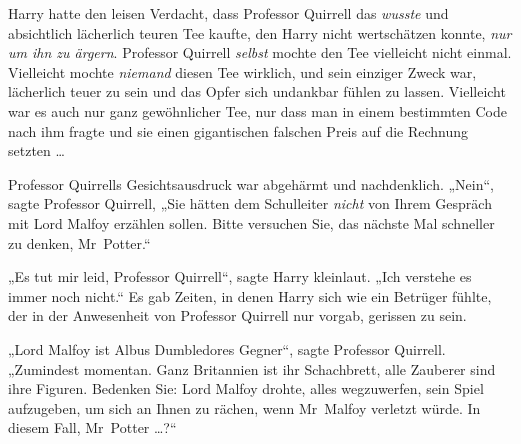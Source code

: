 Harry hatte den leisen Verdacht, dass Professor Quirrell das \emph{wusste} und absichtlich lächerlich teuren Tee kaufte, den Harry nicht wertschätzen konnte, \emph{nur um ihn zu ärgern}. Professor Quirrell \emph{selbst} mochte den Tee vielleicht nicht einmal. Vielleicht mochte \emph{niemand} diesen Tee wirklich, und sein einziger Zweck war, lächerlich teuer zu sein und das Opfer sich undankbar fühlen zu lassen. Vielleicht war es auch nur ganz gewöhnlicher Tee, nur dass man in einem bestimmten Code nach ihm fragte und sie einen gigantischen falschen Preis auf die Rechnung setzten …

Professor Quirrells Gesichtsausdruck war abgehärmt und nachdenklich.
„Nein“, sagte Professor Quirrell,
„Sie hätten dem Schulleiter \emph{nicht} von Ihrem Gespräch mit Lord Malfoy erzählen sollen. Bitte versuchen Sie, das nächste Mal schneller zu denken, Mr~Potter.“

„Es tut mir leid, Professor Quirrell“, sagte Harry kleinlaut.
„Ich verstehe es immer noch nicht.“ Es gab Zeiten, in denen Harry sich wie ein Betrüger fühlte, der in der Anwesenheit von Professor Quirrell nur vorgab, gerissen zu sein.

„Lord Malfoy ist Albus Dumbledores Gegner“, sagte Professor Quirrell.
„Zumindest momentan. Ganz Britannien ist ihr Schachbrett, alle Zauberer sind ihre Figuren. Bedenken Sie: Lord Malfoy drohte, alles wegzuwerfen, sein Spiel aufzugeben, um sich an Ihnen zu rächen, wenn Mr~Malfoy verletzt würde. In diesem Fall, Mr~Potter …?“

